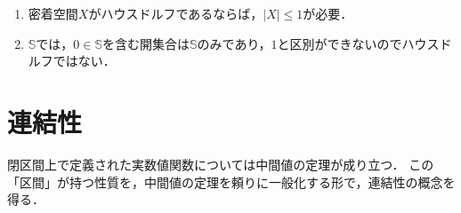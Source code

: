 \documentclass[uplatex, 12pt, dvipdfmx]{jsreport}
\begin{document}
\begin{remark}\mbox{}
    \begin{enumerate}
        \item 密着空間$X$がハウスドルフであるならば，$|X|\le 1$が必要．
        \item $\mathbb{S}$では，$0\in\mathbb{S}$を含む開集合は$\mathbb{S}$のみであり，$1$と区別ができないのでハウスドルフではない．
    \end{enumerate}
\end{remark}

\section{連結性}

\begin{screen}
    閉区間上で定義された実数値関数については中間値の定理が成り立つ．
    この「区間」が持つ性質を，中間値の定理を頼りに一般化する形で，連結性の概念を得る．
\end{screen}
\end{document}
